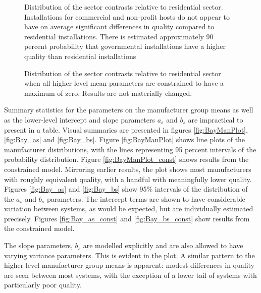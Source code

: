 \documentclass[a4paper]{article}
\begin{document}
\begin{figure} [!htb]
\begin{minipage}[t]{.48\textwidth}
\centering
 \caption{Distribution of the sector contrasts relative to residential sector. Installations for commercial and non-profit hosts do not appear to have on average significant differences in quality compared to residential installations. There is estimated approximately 90 percent probability that governmental installations have a higher quality than residential installations}
   \label{fig:mu_sectors}
\end{minipage}\qquad
\begin{minipage}[t]{.48\textwidth}
\centering
 \caption{Distribution of the sector contrasts relative to residential sector when all higher level mean parameters are constrained to have a maximum of zero. Results are not materially changed.}
 \label{fig:mu_sectors_const}
\end{minipage}
\end{figure}

Summary statistics for the parameters on the manufacturer group means as well as the lower-level intercept and slope parameters $a_s$ and $b_s$ are impractical to present in a table. Visual summaries are presented in figures \ref{fig:BayManPlot}, \ref{fig:Bay_as} and \ref{fig:Bay_bs}. Figure \ref{fig:BayManPlot} shows line plots of the manufacturer distributions, with the lines representing 95 percent intervals of the probability distribution. Figure \ref{fig:BayManPlot_const} shows results from the constrained model. Mirroring earlier results, the plot shows most manufacturers with roughly equivalent quality, with a handful with meaningfully lower quality. Figures \ref{fig:Bay_as} and \ref{fig:Bay_bs} show 95\% intervals of the distribution of the $a_s$ and $b_s$ parameters. The intercept terms are shown to have considerable variation between systems, as would be expected, but are individually estimated precisely. Figures \ref{fig:Bay_as_const} and \ref{fig:Bay_bs_const} show results from the constrained model.

The slope parameters, $b_s$ are modelled explicitly and are also allowed to have varying variance parameters. This is evident in the plot. A similar pattern to the higher-level manufacturer group means is apparent: modest differences in quality are seen between most systems, with the exception of a lower tail of systems with particularly poor quality.
\end{document}
